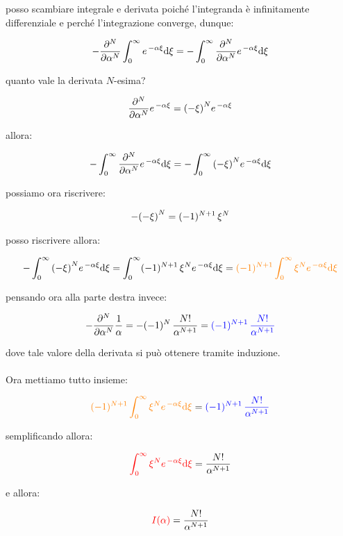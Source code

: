\begin{myapprf}
	posso scambiare integrale e derivata poiché l'integranda è infinitamente differenziale e perché l'integrazione converge, dunque:

\begin{align*}
	- \pdv[N]{\alpha} \int_0^{\infty} e^{\, -\alpha \xi} \dd \xi = - \int_0^{\infty} \pdv[N]{\alpha}  e^{\, -\alpha \xi} \dd \xi
\end{align*}
	
	quanto vale la derivata $N$-esima?
	
\begin{align*}
	\pdv[N]{\alpha}  e^{\, -\alpha \xi} = \qty(-\xi)^N  e^{\, -\alpha \xi}
\end{align*}

	allora:
	
\begin{align*}
	- \int_0^{\infty} \pdv[N]{\alpha}  e^{\, -\alpha \xi} \dd \xi =  - \int_0^{\infty} \qty(-\xi)^N  e^{\, -\alpha \xi}  \dd \xi
\end{align*}

	possiamo ora riscrivere:

\begin{align*}
	-\qty(-\xi)^N = (-1)^{N+1} \, \xi^N
\end{align*}
	
	posso riscrivere allora:

\begin{align*}
	- \int_0^{\infty} \qty(-\xi)^N  e^{\, -\alpha \xi}  \dd \xi = \int_0^{\infty}  (-1)^{N+1} \, \xi^N  e^{\, -\alpha \xi}  \dd \xi = \textcolor{orange}{  (-1)^{N+1} \int_0^{\infty} \xi^N  e^{\, -\alpha \xi}  \dd \xi}
\end{align*}
	
	pensando ora alla parte destra invece:
	
\begin{align*}
	- \pdv[N]{\alpha}  \frac{1}{\alpha} = - (-1)^N \, \frac{N!}{\alpha^{N+1}} =  \textcolor{blue}{ (-1)^{N+1} \, \frac{N!}{\alpha^{N+1}}}
\end{align*}

	dove tale valore della derivata si può ottenere tramite induzione. 
	\\
	\\
	Ora mettiamo tutto insieme:
	
\begin{align*}
	\textcolor{orange}{  (-1)^{N+1} \int_0^{\infty} \xi^N  e^{\, -\alpha \xi}  \dd \xi} = \textcolor{blue}{(-1)^{N+1} \, \frac{N!}{\alpha^{N+1}}}  
\end{align*}
	
	semplificando allora:
	
\begin{align*}
	 \textcolor{red}{ \int_0^{\infty} \xi^N  e^{\, -\alpha \xi}  \dd \xi} =  \frac{N!}{\alpha^{N+1}}
\end{align*}

	e allora: 
	
\begin{align*}
	\textcolor{red}{ I(\alpha)} = \frac{N!}{\alpha^{N+1}}
\end{align*}
\end{myapprf}


